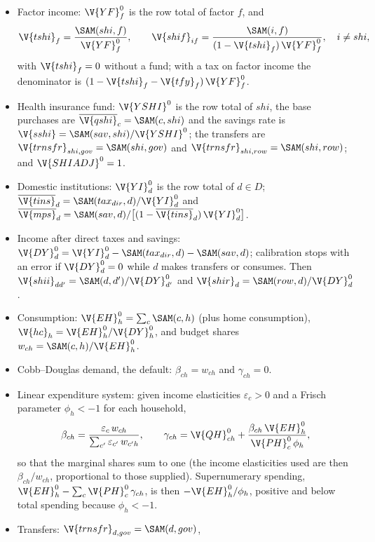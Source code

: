 \begin{itemize}
\item Factor income: $\V{YF}^0_f$ is the row total of factor $f$, and
\begin{equation*}
\V{tshi}_f = \frac{\SAM(shi, f)}{\V{YF}^0_f}, \qquad
\V{shif}_{if} = \frac{\SAM(i, f)}{(1 - \V{tshi}_f)\,\V{YF}^0_f}, \quad i \ne shi,
\end{equation*}
with $\V{tshi}_f = 0$ without a fund; with a tax on factor income the
denominator is $(1 - \V{tshi}_f - \V{tfy}_f)\,\V{YF}^0_f$.
\item Health insurance fund: $\V{YSHI}^0$ is the row total of $shi$, the
base purchases are $\overline{\V{qshi}}_c = \SAM(c, shi)$ and the savings rate
is $\V{sshi} = \SAM(sav, shi) / \V{YSHI}^0$; the transfers are
$\V{trnsfr}_{shi,gov} = \SAM(shi, gov)$ and
$\V{trnsfr}_{shi,row} = \SAM(shi, row)$; and $\V{SHIADJ}^0 = 1$.
\item Domestic institutions: $\V{YI}^0_d$ is the row total of $d \in D$;
$\overline{\V{tins}}_d = \SAM(tax_{dir}, d) / \V{YI}^0_d$ and
$\overline{\V{mps}}_d = \SAM(sav, d) / \bigl[(1 - \overline{\V{tins}}_d)\,\V{YI}^0_d\bigr]$.
\item Income after direct taxes and savings:
$\V{DY}^0_d = \V{YI}^0_d - \SAM(tax_{dir}, d) - \SAM(sav, d)$; calibration stops
with an error if $\V{DY}^0_d = 0$ while $d$ makes transfers or consumes. Then
$\V{shii}_{dd'} = \SAM(d, d') / \V{DY}^0_{d'}$ and
$\V{shir}_d = \SAM(row, d) / \V{DY}^0_d$.
\item Consumption: $\V{EH}^0_h = \sum_c \SAM(c, h)$ (plus home consumption),
$\V{hc}_h = \V{EH}^0_h / \V{DY}^0_h$, and budget shares
$w_{ch} = \SAM(c, h) / \V{EH}^0_h$.
\item Cobb--Douglas demand, the default: $\beta_{ch} = w_{ch}$ and
$\gamma_{ch} = 0$.
\item Linear expenditure system: given income elasticities
$\varepsilon_c > 0$ and a Frisch parameter $\phi_h < -1$ for each household,
\begin{equation*}
\beta_{ch} = \frac{\varepsilon_c\,w_{ch}}{\sum_{c'} \varepsilon_{c'}\,w_{c'h}},
\qquad
\gamma_{ch} = \V{QH}^0_{ch} + \frac{\beta_{ch}\,\V{EH}^0_h}{\V{PH}^0_c\,\phi_h},
\end{equation*}
so that the marginal shares sum to one (the income elasticities used are then
$\beta_{ch}/w_{ch}$, proportional to those supplied). Supernumerary spending,
$\V{EH}^0_h - \sum_c \V{PH}^0_c\,\gamma_{ch}$, is then $-\V{EH}^0_h/\phi_h$,
positive and below total spending because $\phi_h < -1$.
\item Transfers: $\V{trnsfr}_{d,gov} = \SAM(d, gov)$,

\end{itemize}
